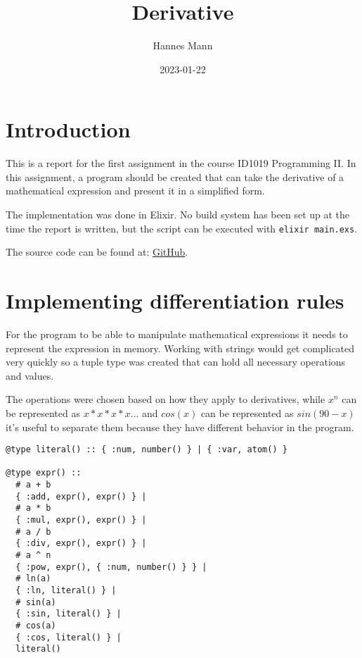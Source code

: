 \documentclass[a4paper,11pt]{article}
\begin{document}
\title{
    \textbf{Derivative}
}
\author{Hannes Mann}
\date{2023-01-22}

\maketitle

\section*{Introduction}

This is a report for the first assignment in the course ID1019 Programming II.
In this assignment, a program should be created that can take the derivative of a mathematical expression and present it in a simplified form.

The implementation was done in Elixir. No build system has been set up at the time the report is written, but the script can be executed with \texttt{elixir main.exs}.

The source code can be found at: \href{https://github.com/hannesmann/ID1019/tree/main/src/derivative}{GitHub}.

\section*{Implementing differentiation rules}

For the program to be able to manipulate mathematical expressions it needs to represent the expression in memory.
Working with strings would get complicated very quickly so a tuple type was created that can hold all necessary operations and values.

The operations were chosen based on how they apply to derivatives, while $x^n$ can be represented as $x*x*x*x\dots$ and $cos(x)$ can be represented as $sin(90-x)$ it's useful to
separate them because they have different behavior in the program.

\begin{verbatim}
@type literal() :: { :num, number() } | { :var, atom() }

@type expr() ::
  # a + b
  { :add, expr(), expr() } |
  # a * b
  { :mul, expr(), expr() } |
  # a / b
  { :div, expr(), expr() } |
  # a ^ n
  { :pow, expr(), { :num, number() } } |
  # ln(a)
  { :ln, literal() } |
  # sin(a)
  { :sin, literal() } |
  # cos(a)
  { :cos, literal() } |
  literal()
\end{verbatim}
\end{document}
